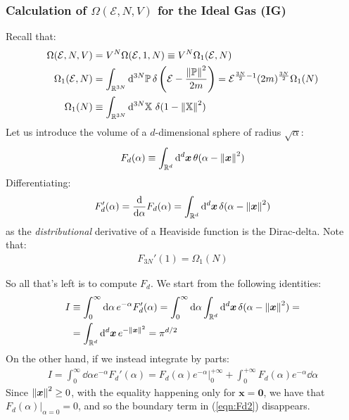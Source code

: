 \documentclass[../template.tex]{subfiles}
\begin{document}
\subsubsection{Calculation of $\Omega(\mathcal{E},N,V)$ for the Ideal Gas (IG)}
Recall that:
\begin{align} \label{eqn:omega-back}
    \Omega(\mathcal{E},N,V) &= V^N \Omega(\mathcal{E},1,N) \equiv V^N \Omega_1(\mathcal{E},N)\\ \nonumber
    \Omega_1(\mathcal{E},N) &= \int_{\mathbb{R}^{3N}} \dd[3N]{\mathbb{P}} \delta\left(\mathcal{E}-\frac{\norm{\mathbb{P}}^2}{2m} \right) = \mathcal{E}^{\frac{3N}{2}-1 } (2m)^{\frac{3N}{2}} \Omega_1(N) \\ \nonumber %
    \Omega_1(N) &\equiv \int_{\mathbb{R}^{3N}} \dd[3N]{\mathbb{X}}\, \delta(1-\norm{\mathbb{X}}^2) 
\end{align}
Let us introduce the volume of a $d$-dimensional sphere of radius $\sqrt{\alpha}$:
\begin{align*}
    F_d(\alpha) \equiv \int_{\mathbb{R}^d} \dd[d]{\bm{x}} \theta(\alpha - \norm{\bm{x}}^2)
\end{align*}
Differentiating:
\begin{align*}
    F_d'(\alpha) = \dv{\alpha} F_d(\alpha) = \int_{\mathbb{R}^d} \dd[d]{\bm{x}} \delta(\alpha - \norm{\bm{x}}^2)
\end{align*}
as the \textit{distributional} derivative of a Heaviside function is the Dirac-delta. Note that:
\begin{align}\label{eqn:omega-rel}
    F_{3N}'(1) = \Omega_1(N)
\end{align} 

So all that's left is to compute $F_d$. We start from the following identities:
\begin{align*}
    I &\equiv \int_0^\infty \dd{\alpha} e^{-\alpha} F_d'(\alpha) = \int_0^{\infty} \dd{\alpha} \int_{\mathbb{R}^d} \dd[d]{\bm{x}} \delta(\alpha - \norm{\bm{x}}^2) =\\
    &= \int_{\mathbb{R}^d} \dd[d]{\bm{x}} e^{-\norm{\bm{x}}^2} = \pi^{d/2}
\end{align*}
On the other hand, if we instead integrate by parts:
\begin{align}\label{eqn:Fd2}
    I = \int_0^{\infty} \dd{\alpha} e^{-\alpha} F_d'(\alpha) = F_d(\alpha) e^{-\alpha} \Big|_0^{+\infty} + \int_0^{+\infty} F_d(\alpha) e^{-\alpha} \dd{\alpha}
\end{align}
Since $\norm{\bm{x}}^2 \geq 0$, with the equality happening only for $\bm{x} = \bm{0}$, we have that $F_d(\alpha)\Big|_{\alpha = 0} = 0$, and so the boundary term in (\ref{eqn:Fd2}) disappears.
\end{document}
